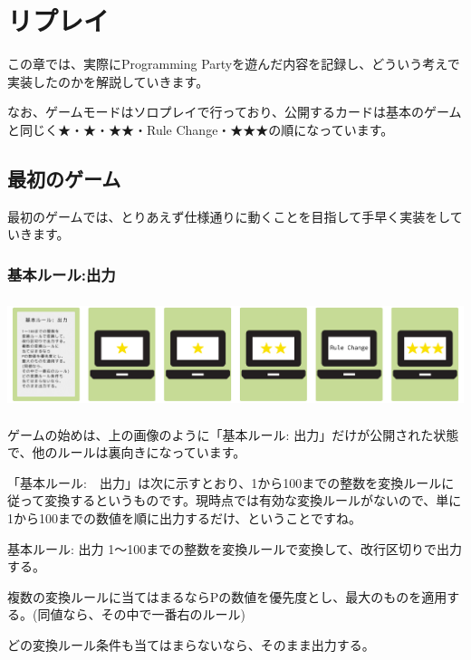 \documentclass[index]{subfiles}
\begin{document}
  \chapter{リプレイ}
  \label{ch:second}

この章では、実際にProgramming Partyを遊んだ内容を記録し、どういう考えで実装したのかを解説していきます。

なお、ゲームモードはソロプレイで行っており、公開するカードは基本のゲームと同じく★・★・★★・Rule Change・★★★の順になっています。

  \section{最初のゲーム}
  \label{sec:replay_first}

最初のゲームでは、とりあえず仕様通りに動くことを目指して手早く実装をしていきます。

  \subsection{基本ルール:出力}

\begin{center}
  \includegraphics[height=3.2cm]{image/201_replay_first.png}
\end{center}
  
ゲームの始めは、上の画像のように「基本ルール: 出力」だけが公開された状態で、他のルールは裏向きになっています。

「基本ルール:　出力」は次に示すとおり、1から100までの整数を変換ルールに従って変換するというものです。現時点では有効な変換ルールがないので、単に1から100までの数値を順に出力するだけ、ということですね。
  
\begin{itembox}[l]{基本ルール: 出力}
1～100までの整数を変換ルールで変換して、改行区切りで出力する。

複数の変換ルールに当てはまるならPの数値を優先度とし、最大のものを適用する。(同値なら、その中で一番右のルール)

どの変換ルール条件も当てはまらないなら、そのまま出力する。
\end{itembox}
\end{document}
